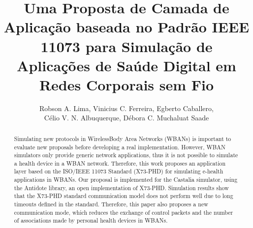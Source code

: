 \documentclass[12pt]{article}
\title{Uma Proposta de Camada de Aplicação baseada no Padrão IEEE 11073 para Simulação de Aplicações de Saúde Digital em Redes Corporais sem Fio}
\author{Robson A. Lima, Vinicius C. Ferreira, Egberto Caballero,\\ Célio V. N. Albuquerque, Débora C. Muchaluat Saade}
\begin{document}
 

\maketitle

\begin{abstract}
Simulating new protocols in WirelessBody Area Networks (WBANs) is important to evaluate new proposals before developing a real implementation. However, WBAN simulators only provide generic network applications, thus it is not possible to simulate a health device in a WBAN network. Therefore, this work proposes an application layer based on the ISO/IEEE 11073 Standard (X73-PHD) for simulating e-health applications in WBANs. Our proposal is implemented for the Castalia simulator, using the Antidote library, an open implementation of X73-PHD. Simulation results show that the X73-PHD standard communication model does not perform well due to long timeouts defined in the standard. Therefore, this paper also proposes a new communication mode, which reduces the exchange of control packets and the number of associations made by personal health devices in WBANs.
\end{abstract}
     
\end{document}

